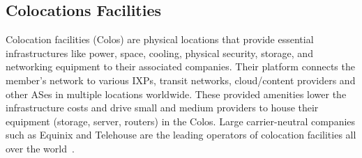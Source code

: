 
	\subsection{Colocations Facilities}
	\label{subsec:colos}

	Colocation facilities (Colos) are physical locations that provide essential infrastructures like power, space, cooling, physical security, storage, and networking equipment to their associated companies. Their platform connects the member's network to various IXPs, transit networks, cloud/content providers and other ASes in multiple locations worldwide. These provided amenities lower the infrastructure costs and drive small and medium providers to house their equipment (storage, server, routers) in the Colos. Large carrier-neutral companies such as Equinix and Telehouse are the leading operators of colocation facilities all over the world~\cite{Giotsas:2015:MPI:2716281.2836122, Kotronis:2017:STC:3131365.3131388}.

	


	